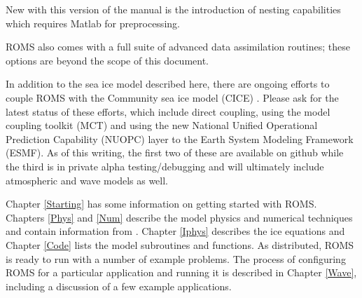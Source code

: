 New with this version of the manual is the introduction of nesting
capabilities which requires Matlab for preprocessing.

ROMS also comes with a full suite of advanced data assimilation
routines; these options are beyond the scope of this document.

In addition to the sea ice model described here, there are ongoing
efforts to couple ROMS with the Community sea ice model (CICE)
\citep{Hunke_2013}. Please ask for the latest status of these
efforts, which include direct coupling, using the model coupling
toolkit (MCT) and using the new National Unified Operational Prediction
Capability (NUOPC) layer to the Earth System
Modeling Framework (ESMF). As of this writing, the first two of
these are available on github while the third is in private alpha
testing/debugging and will ultimately include atmospheric and wave
models as well.

Chapter \ref{Starting} has some information on getting started with
ROMS.
Chapters \ref{Phys} and \ref{Num} describe the model physics and
numerical techniques and contain information from 
\citet{SS2008b,Haidvogel07}.
Chapter \ref{Iphys} describes the ice equations and
Chapter \ref{Code} lists the model subroutines and functions.
As distributed, ROMS is ready to run with a number of example problems.
The process of configuring ROMS for a particular application and
running it is
described in Chapter \ref{Wave}, including a discussion of a few example
applications.
